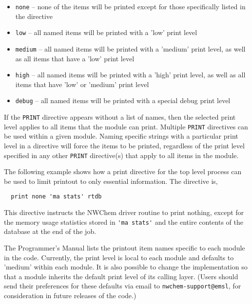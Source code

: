\begin{itemize}
\item \verb+none+ -- none of the items will be printed except for those
specifically listed in the directive
\item \verb+low+ -- all named items will be printed with a 'low' print level
\item \verb+medium+ -- all named items will be printed with a 'medium' print
level, as well as all items that have a 'low' print level
\item \verb+high+ -- all named items will be printed with a 'high' print
level, as well as all items that have 'low' or 'medium' print level
\item \verb+debug+ -- all named items will be printed with a special debug print level
\end{itemize}

If the \verb+PRINT+ directive appears without a list of names, then the
selected print level applies to all items that the module can print.
Multiple \verb+PRINT+ directives can be used within a given module.  Naming
specific strings with a particular print level in a directive will force the
items to be printed, regardless of the print level specified in any other 
\verb+PRINT+ directive(s) that apply to all items in the module.

   

The following example shows how a print directive for the top level process 
can be used to limit printout to only essential information.
The directive is,

\begin{verbatim}
  print none 'ma stats' rtdb
\end{verbatim}

This directive instructs the NWChem driver routine to print nothing, except
for the memory usage statistics stored in \verb+'ma stats'+ and the entire 
contents of the database at the end of the job. 

The Programmer's Manual lists the printout item names specific to each
module in the code.
Currently, the print level is local to each module
and defaults to 'medium' within each module.  It is also possible to
change the implementation so that a module inherits the default print level 
of its calling layer.  (Users should send their preferences for these
defaults via email to \verb+nwchem-support@emsl+, for consideration in
future releases of the code.)


